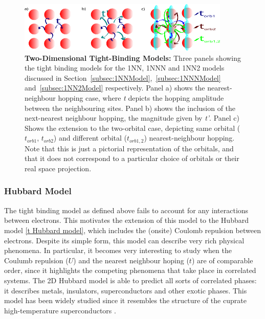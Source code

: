 \documentclass[12pt]{article}
\begin{document}
\begin{figure}[htbp]  %
    \centering
    \includegraphics[width=0.9\textwidth]{2Dhubbardmodel.png}  %
    \caption{\textbf{Two-Dimensional Tight-Binding Models:} Three panels showing the tight binding models for the 1NN, 1NNN and 1NN2 models discussed in Section~\ref{subsec:1NNModel},~\ref{subsec:1NNNModel} and~\ref{subsec:1NN2Model} respectively. Panel a) shows the nearest-neighbour hopping case, where \textit{t} depicts the hopping amplitude between the neighbouring sites. Panel b) shows the inclusion of the next-nearest neighbour hopping, the magnitude given by \textit{t'}.
    Panel c) Shows the extension to the two-orbital case, depicting  same orbital ($t_{orb1}$, $t_{orb2}$) and different orbital ($t_{orb1,2}$) nearest-neighbour hopping. Note that this is just a pictorial representation of the orbitals, and that it does not correspond to a particular choice of orbitals or their real space projection. }
    \label{fig:2D Hubbard model}
\end{figure}

\newpage

\subsubsection{Hubbard Model}
\label{subsec: HubbardModel}

The  tight binding model as defined above fails to account for any interactions between electrons. This motivates the extension of this model to the Hubbard model \eqref{t Hubbard model}, which includes the (onsite) Coulomb repulsion between electrons. Despite its simple form, this model can describe very rich physical phenomena.
In particular, it becomes very interesting to study when the Coulumb repulsion ($U$) and the nearest neighbour hoping ($t$) are of comparable order, since it highlights the competing phenomena that take place in correlated systems. 
The 2D Hubbard model is able to predict all sorts of correlated phases: it describes metals, insulators, superconductors and other exotic phases\cite{white1989numerical,hirsch1985two, anderson1990luttinger,sun2011nearly}. 
This model has been widely studied since it resembles the structure of the cuprate high-temperature superconductors \cite{dagotto1994correlated}. 
\end{document}

